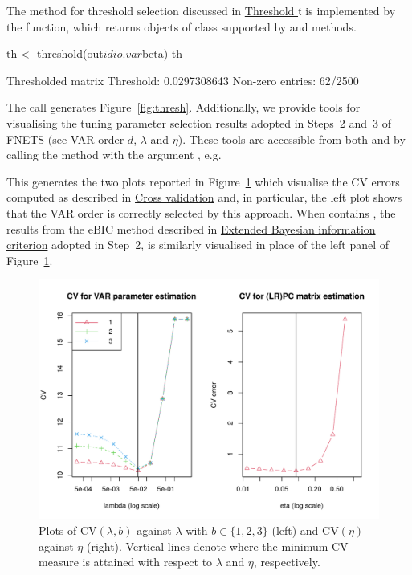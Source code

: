 The method for threshold selection discussed in \hyperref[sec:tuning:thresh]{Threshold $\mathfrak{t}$} 
is implemented by the  function, which returns objects of  class supported by  and  methods.
\begin{example}
th <- threshold(out$idio.var$beta)
th

Thresholded matrix 
Threshold: 0.0297308643
Non-zero entries: 62/2500
\end{example}
The call  generates Figure~\ref{fig:thresh}.
Additionally, we provide tools for visualising the tuning parameter selection results adopted in Steps~2 and~3 of FNETS (see \hyperref[sec:order:lambda]{VAR order $d$, $\lambda$ and $\eta$}). 
These tools are accessible from both  and  by calling the  method with the argument , e.g.\ 
This generates the two plots reported in Figure~\ref{figure:order_ex} which visualise the CV errors computed as described in \hyperref[sec:tuning:cv]{Cross validation} and, in particular, the left plot shows that the VAR order is correctly selected by this approach.
When \code{tuning.args} contains \code{tuning =  "bic"}, the results from the eBIC method described in \hyperref[sec:tuning:ebic]{Extended Bayesian information criterion} adopted in Step~2, is similarly visualised in place of the left panel of Figure~\ref{figure:order_ex}.

\begin{figure}[htb]
\centering
 \includegraphics[width = .8\textwidth]{figs/order_example.pdf} 
\caption{
Plots of CV$(\lambda, b)$ against $\lambda$ with $b \in \{1, 2, 3\}$ (left) and CV$(\eta)$ against $\eta$ (right). Vertical lines denote where the minimum CV measure is attained with respect to $\lambda$ and $\eta$, respectively.}
\label{figure:order_ex}
\end{figure}

